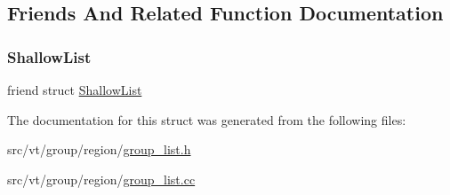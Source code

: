 \subsection{Friends And Related Function Documentation}
\mbox{\label{structvt_1_1group_1_1region_1_1_list_a69d0f04a06a9f069becd00a6c894dbe9}} 
\subsubsection{\texorpdfstring{Shallow\+List}{ShallowList}}
{\footnotesize\ttfamily friend struct \hyperlink{structvt_1_1group_1_1region_1_1_shallow_list}{Shallow\+List}\hspace{0.3cm}{\ttfamily [friend]}}



The documentation for this struct was generated from the following files\+:\begin{DoxyCompactItemize}
\item 
src/vt/group/region/\hyperlink{group__list_8h}{group\+\_\+list.\+h}\item 
src/vt/group/region/\hyperlink{group__list_8cc}{group\+\_\+list.\+cc}\end{DoxyCompactItemize}
